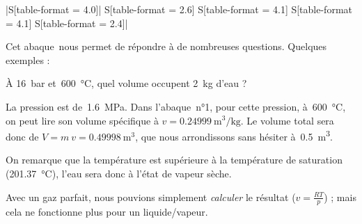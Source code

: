 \begin{table}
\begin{center}
\begin{footnotesize}
\begin{tabular}{
		|S[table-format = 4.0]|%
		S[table-format = 2.6]%
		S[table-format = 4.1]%
		S[table-format = 4.1]%
		S[table-format = 2.4]|%
		}
 		\end{tabular}\end{footnotesize}\end{center}
 		\caption{Extrait de l’abaque~n°1. Ici les mesures sont faites à~\SI{1,6}{\mega\pascal}, c’est-à-dire \SI{16}{\bar}. On observe une discontinuité entre \SI{200}{\degreeCelsius} et~\SI{300}{\degreeCelsius} : c’est le changement d’état qui a eu lieu à $T_\text{sat} = \SI{201,37}{\degreeCelsius}$.}
 		\label{tab_abaque1extrait}
 		\end{table}

		\clearfloats %
		Cet abaque~nous permet de répondre à de nombreuses questions. Quelques exemples :
			
			\begin{anexample}
			À \SI{16}{\bar} et~\SI{600}{\degreeCelsius}, quel volume occupent \SI{2}{\kilogram} d’eau ? 
			
				\begin{answer}La pression est de~\SI{1,6}{\mega\pascal}. Dans l’abaque~n°1, pour cette pression, à~\SI{600}{\degreeCelsius}, on peut lire son volume spécifique à $v = \SI{0,24999}{\metre\cubed\per\kilogram}$. Le volume total sera donc de $V = m \ v = \SI{0,49998}{\metre\cubed}$, que nous arrondissons sans hésiter à~\SI{0,5}{\metre\cubed}.
					\begin{remark}On remarque que la température est supérieure à la température de saturation (\SI{201,37}{\degreeCelsius}), l’eau sera donc à l’état de vapeur sèche.\end{remark}
					\begin{remark}Avec un gaz parfait, nous pouvions simplement \emph{calculer} le résultat ($v = \frac{R T}{p}$) ; mais cela ne fonctionne plus pour un liquide/vapeur.\end{remark}\end{answer}
			\end{anexample}

